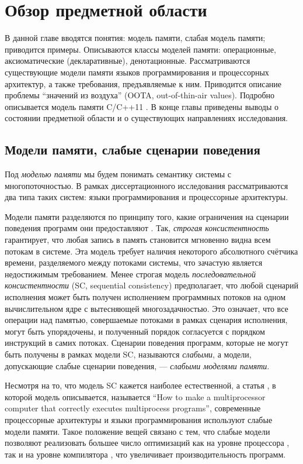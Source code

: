 \chapter{Обзор предметной области} \label{sec:overview}
В данной главе вводятся понятия: модель памяти, слабая модель памяти;
приводится примеры. Описываются
классы моделей памяти: операционные, аксиоматические (декларативные),
денотационные.
Рассматриваются существующие модели памяти языков программирования и
процессорных архитектур, а также требования, предъявляемые к ним.
Приводится описание проблемы ``значений из воздуха'' (OOTA, out-of-thin-air values).
Подробно описывается модель памяти C/C++11 \cite{Batty-al:POPL11}.
В конце главы приведены выводы о состоянии предметной области и о существующих
направлениях исследования.

\section{Модели памяти, слабые сценарии поведения}
Под \emph{моделью памяти} мы будем понимать семантику системы с многопоточностью.
В рамках диссертационного исследования рассматриваются два типа таких систем:
языки программирования и процессорные архитектуры.

Модели памяти разделяются по принципу того, какие ограничения на сценарии поведения
программ они предоставляют \cite{Kshemkalyani-Singhal:2011}.
Так, \emph{строгая консистентность} гарантирует, что любая запись в память становится мгновенно видна
всем потокам в системе. Эта модель требует наличия некоторого абсолютного счётчика времени, разделяемого между потоками системы,
что зачастую является недостижимым требованием. Менее строгая модель \emph{последовательной консистентности} \cite{Lamport:TC79}
(SC, sequential consistency)
предполагает, что любой сценарий исполнения может быть получен исполнением программных потоков на одном вычислительном
ядре с вытесняющей многозадачностью. Это означает, что все операции над памятью, совершаемые потоками в рамках сценария исполнения,
могут быть упорядочены, и полученный порядок согласуется с порядком инструкций в самих потоках.
Сценарии поведения программ, которые не могут быть получены в рамках модели SC, называются
\emph{слабыми}, а модели, допускающие слабые сценарии поведения, --- \emph{слабыми моделями памяти}.

Несмотря на то, что модель SC кажется наиболее естественной, а статья \cite{Lamport:TC79},
в которой модель описывается, называется ``How to make a multiprocessor computer that correctly executes multiprocess programs'',
современные процессорные архитектуры и языки программирования используют слабые модели памяти. Такое положение вещей
связано с тем, что слабые модели позволяют реализовать большее число оптимизаций как на уровне процессора
\cite{Hennessy-Patterson:BOOK}, так и на уровне компилятора \cite{Aho-al:BOOK86,Muchnick:BOOK97},
что увеличивает производительность программ.

